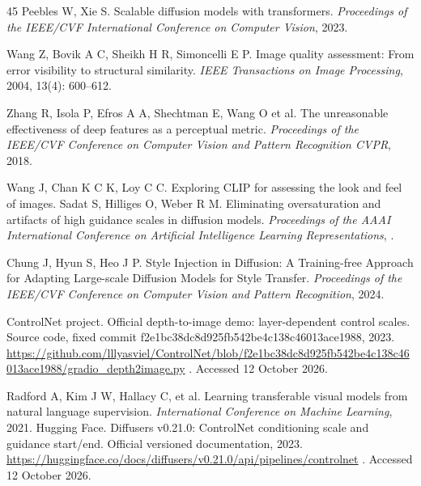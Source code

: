 \documentclass[times,twocolumn,final]{elsarticle}
\providecommand{\DIFadd}[1]{{\protect\color{blue} \sf #1}} %
\providecommand{\DIFdel}[1]{{\protect\color{red} \scriptsize #1}} %
\providecommand{\DIFaddbegin}{} %
\providecommand{\DIFaddend}{} %
\providecommand{\DIFdelbegin}{} %
\providecommand{\DIFdelend}{} %
\begin{document}
\begin{thebibliography}{45}
\DIFdel{Peebles W, Xie S. Scalable diffusion models with transformers. \textit{Proceedings of the IEEE/CVF International Conference on Computer Vision}, 2023.
}%

\DIFdelend {}
Wang Z, Bovik A C, Sheikh H R, Simoncelli E P. Image quality assessment: From error visibility to structural similarity. \textit{IEEE Transactions on Image Processing}, 2004, 13(4): 600--612.

Zhang R, Isola P, Efros A A, \DIFdelbegin \DIFdel{Shechtman E, Wang O}\DIFdelend \DIFaddbegin \DIFadd{et al}\DIFaddend . The unreasonable effectiveness of deep features as a perceptual metric. \textit{\DIFdelbegin \DIFdel{Proceedings of the IEEE/CVF Conference on Computer Vision and Pattern Recognition}\DIFdelend \DIFaddbegin \DIFadd{CVPR}\DIFaddend }, 2018.

\DIFdelbegin %
\DIFdel{Wang J, Chan K C K, Loy C C. Exploring CLIP for assessing the look and feel of images. }\DIFdelend \DIFaddbegin {}
\DIFadd{Sadat S, Hilliges O, Weber R M. Eliminating oversaturation and artifacts of high guidance scales in diffusion models. }\DIFaddend \textit{\DIFdelbegin \DIFdel{Proceedings of the AAAI }\DIFdelend \DIFaddbegin \DIFadd{International }\DIFaddend Conference on \DIFdelbegin \DIFdel{Artificial Intelligence}\DIFdelend \DIFaddbegin \DIFadd{Learning Representations}\DIFaddend }, \DIFaddbegin \DIFadd{2025.
}

\DIFadd{Chung J, Hyun S, Heo J P. Style Injection in Diffusion: A Training-free Approach for Adapting Large-scale Diffusion Models for Style Transfer. \textit{Proceedings of the IEEE/CVF Conference on Computer Vision and Pattern Recognition}, 2024.
}

\DIFadd{ControlNet project. Official depth-to-image demo: layer-dependent control scales. Source code, fixed commit f2e1bc38dc8d925fb542be4c138c46013ace1988, }\DIFaddend 2023. \DIFaddbegin \url{https://github.com/lllyasviel/ControlNet/blob/f2e1bc38dc8d925fb542be4c138c46013ace1988/gradio_depth2image.py}\DIFadd{. Accessed 12 October 2026.
}\DIFaddend 

\DIFdelbegin %
\DIFdel{Radford A, Kim J W, Hallacy C, et al. Learning transferable visual models from natural language supervision. \textit{International Conference on Machine Learning}, 2021.
}\DIFdelend \DIFaddbegin {}
\DIFadd{Hugging Face. Diffusers v0.21.0: ControlNet conditioning scale and guidance start/end. Official versioned documentation, 2023. }\url{https://huggingface.co/docs/diffusers/v0.21.0/api/pipelines/controlnet}\DIFadd{. Accessed 12 October 2026.
}\DIFaddend 

\end{thebibliography}
\DIFaddbegin \endgroup
 \DIFaddend
\end{document}
